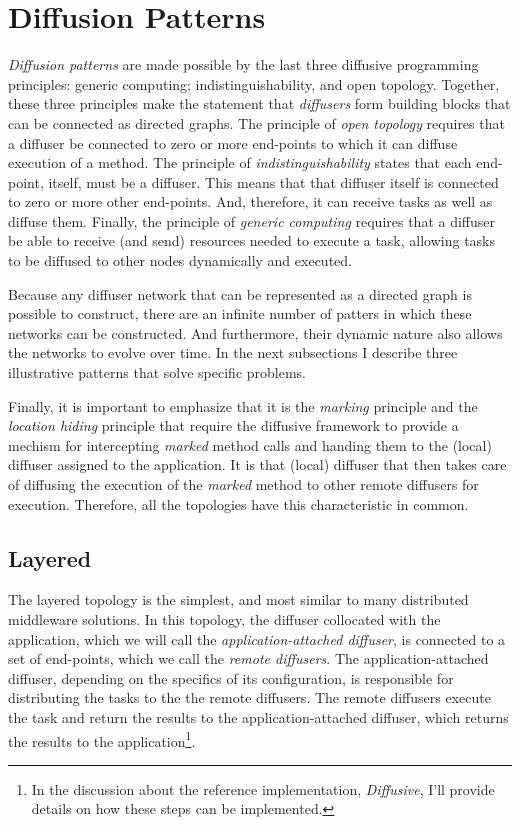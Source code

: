 \documentclass[11pt]{article}
\begin{document}
%
%
\section{Diffusion Patterns}\label{sec:diffusion_patterns}
\emph{Diffusion patterns} are made possible by the last three diffusive programming principles: generic computing; indistinguishability, and open topology. Together, these three principles make the statement that \emph{diffusers} form building blocks that can be connected as directed graphs. The principle of \emph{open topology} requires that a diffuser be connected to zero or more end-points to which it can diffuse execution of a method. The principle of \emph{indistinguishability} states that each end-point, itself, must be a diffuser. This means that that diffuser itself is connected to zero or more other end-points. And, therefore, it can receive tasks as well as diffuse them. Finally, the principle of \emph{generic computing} requires that a diffuser be able to receive (and send) resources needed to execute a task, allowing tasks to be diffused to other nodes dynamically and executed.

Because any diffuser network that can be represented as a directed graph is possible to construct, there are an infinite number of patters in which these networks can be constructed. And furthermore, their dynamic nature also allows the networks to evolve over time. In the next subsections I describe three illustrative patterns that solve specific problems.

Finally, it is important to emphasize that it is the \emph{marking} principle and the \emph{location hiding} principle that require the diffusive framework to provide a mechism for intercepting \emph{marked} method calls and handing them to the (local) diffuser assigned to the application. It is that (local) diffuser that then takes care of diffusing the execution of the \emph{marked} method to other remote diffusers for execution. Therefore, all the topologies have this characteristic in common.

\subsection{Layered}
The layered topology is the simplest, and most similar to many distributed middleware solutions. In this topology, the diffuser collocated with the application, which we will call the \emph{application-attached diffuser}, is connected to a set of end-points, which we call the \emph{remote diffusers}. The application-attached diffuser, depending on the specifics of its configuration, is responsible for distributing the tasks to the the remote diffusers. The remote diffusers execute the task and return the results to the application-attached diffuser, which returns the results to the application\footnote{In the discussion about the reference implementation, \emph{Diffusive}, I'll provide details on how these steps can be implemented.}. 
\end{document}
